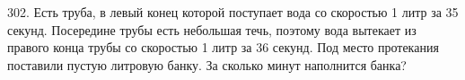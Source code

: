 302. Есть труба, в левый конец которой поступает вода со скоростью 1 литр за 35 секунд. Посередине трубы есть небольшая течь, поэтому вода вытекает из правого конца трубы со скоростью 1 литр за 36 секунд. Под место протекания поставили пустую литровую банку. За сколько минут наполнится банка?\\
